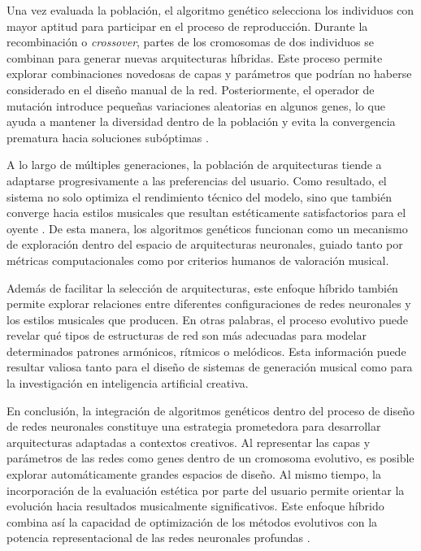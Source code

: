 \documentclass[12pt]{report}
\begin{document}
Una vez evaluada la población, el algoritmo genético selecciona los individuos con mayor aptitud para participar en el proceso de reproducción. Durante la recombinación o \textit{crossover}, partes de los cromosomas de dos individuos se combinan para generar nuevas arquitecturas híbridas. Este proceso permite explorar combinaciones novedosas de capas y parámetros que podrían no haberse considerado en el diseño manual de la red. Posteriormente, el operador de mutación introduce pequeñas variaciones aleatorias en algunos genes, lo que ayuda a mantener la diversidad dentro de la población y evita la convergencia prematura hacia soluciones subóptimas \cite{goldberg1989genetic}.

A lo largo de múltiples generaciones, la población de arquitecturas tiende a adaptarse progresivamente a las preferencias del usuario. Como resultado, el sistema no solo optimiza el rendimiento técnico del modelo, sino que también converge hacia estilos musicales que resultan estéticamente satisfactorios para el oyente \cite{branke2002evolutionary}. De esta manera, los algoritmos genéticos funcionan como un mecanismo de exploración dentro del espacio de arquitecturas neuronales, guiado tanto por métricas computacionales como por criterios humanos de valoración musical.

Además de facilitar la selección de arquitecturas, este enfoque híbrido también permite explorar relaciones entre diferentes configuraciones de redes neuronales y los estilos musicales que producen. En otras palabras, el proceso evolutivo puede revelar qué tipos de estructuras de red son más adecuadas para modelar determinados patrones armónicos, rítmicos o melódicos. Esta información puede resultar valiosa tanto para el diseño de sistemas de generación musical como para la investigación en inteligencia artificial creativa.

En conclusión, la integración de algoritmos genéticos dentro del proceso de diseño de redes neuronales constituye una estrategia prometedora para desarrollar arquitecturas adaptadas a contextos creativos. Al representar las capas y parámetros de las redes como genes dentro de un cromosoma evolutivo, es posible explorar automáticamente grandes espacios de diseño. Al mismo tiempo, la incorporación de la evaluación estética por parte del usuario permite orientar la evolución hacia resultados musicalmente significativos. Este enfoque híbrido combina así la capacidad de optimización de los métodos evolutivos con la potencia representacional de las redes neuronales profundas \cite{mccormack2013computers}.
\end{document}
